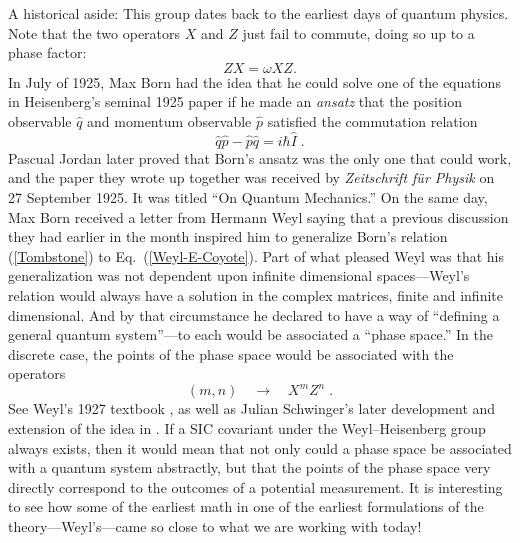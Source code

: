 \documentclass[aps,pra,superscriptaddress,10pt,tightenlines,twocolumn,nofootinbib]{revtex4}
\begin{document}
A historical aside:  This group dates back to the earliest days of
quantum physics.  Note that the two operators $X$ and $Z$ just fail to
commute, doing so up to a phase factor:
\begin{equation}
ZX = \omega XZ.
\label{Weyl-E-Coyote}
\end{equation}
In July of 1925, Max Born had the idea that he could solve one of the equations in Heisenberg's seminal 1925 paper if he made an {\it ansatz\/} that the position observable $\hat{q}$ and momentum observable $\hat{p}$ satisfied the commutation relation \cite{Bernstein05,Fedak09}
\begin{equation}
\hat{q}\hat{p} - \hat{p}\hat{q}= i\hbar\hat{I}\;.
\label{Tombstone}
\end{equation}
Pascual Jordan later proved that Born's ansatz was the only one that could work, and the paper they wrote up together was received by {\sl Zeitschrift f\"ur Physik\/} on 27 September 1925.  It was titled ``On Quantum Mechanics.'' On the same day, Max Born received a letter from Hermann Weyl \cite{Scholz08} saying that a previous discussion they had earlier in the month inspired him to generalize Born's relation (\ref{Tombstone}) to Eq.~(\ref{Weyl-E-Coyote}).  Part of what pleased Weyl was that his generalization was not dependent upon infinite dimensional spaces---Weyl's relation would always have a solution in the complex matrices, finite and infinite dimensional.  And by that circumstance he declared to have a way of ``defining a general quantum system''---to each would be associated a ``phase space.''  In the discrete case, the points of the phase space would be associated with the operators
\begin{equation}
(m,n) \quad \longrightarrow \quad X^m Z^n\;.
\end{equation}
See Weyl's 1927 textbook \cite{Weyl27}, as well as Julian Schwinger's later
development and extension of the idea in \cite{Schwinger70}.  If a SIC
covariant under the Weyl--Heisenberg group always exists, then it
would mean that not only could a phase space be associated with a
quantum system abstractly, but that the points of the phase space very
directly correspond to the outcomes of a potential measurement.  It is
interesting to see how some of the earliest math in one of the
earliest formulations of the theory---Weyl's---came so close to what
we are working with today!
\end{document}
